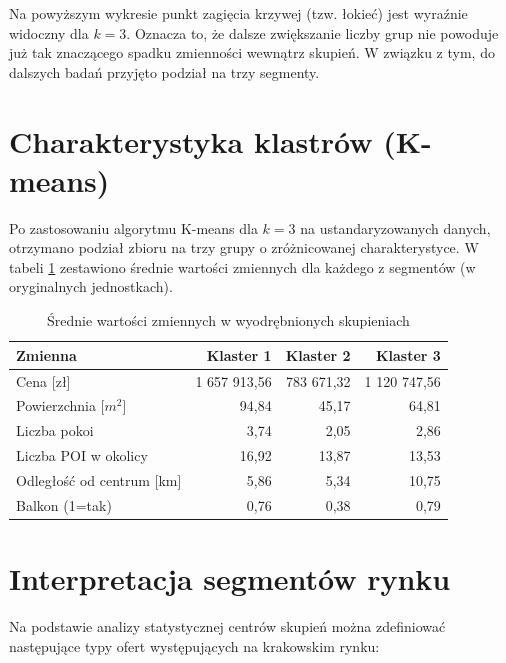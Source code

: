 \documentclass{report}
\begin{document}
Na powyższym wykresie punkt zagięcia krzywej (tzw. łokieć) jest wyraźnie widoczny dla $k=3$. Oznacza to, że dalsze zwiększanie liczby grup nie powoduje już tak znaczącego spadku zmienności wewnątrz skupień. W związku z tym, do dalszych badań przyjęto podział na trzy segmenty.

\section{Charakterystyka klastrów (K-means)}

Po zastosowaniu algorytmu K-means dla $k=3$ na ustandaryzowanych danych, otrzymano podział zbioru na trzy grupy o zróżnicowanej charakterystyce. W tabeli \ref{tab:klastry} zestawiono średnie wartości zmiennych dla każdego z segmentów (w oryginalnych jednostkach).

\begin{table}[H]
\caption{Średnie wartości zmiennych w wyodrębnionych skupieniach}
\label{tab:klastry}
\centering
\begin{tabular}{lrrr}
\toprule
Zmienna & Klaster 1 & Klaster 2 & Klaster 3 \\
\midrule
Cena [zł] & 1 657 913,56 & 783 671,32 & 1 120 747,56 \\
Powierzchnia [$m^2$] & 94,84 & 45,17 & 64,81 \\
Liczba pokoi & 3,74 & 2,05 & 2,86 \\
Liczba POI w okolicy & 16,92 & 13,87 & 13,53 \\
Odległość od centrum [km] & 5,86 & 5,34 & 10,75 \\
Balkon (1=tak) & 0,76 & 0,38 & 0,79 \\
\bottomrule
\end{tabular}
\end{table}

\section{Interpretacja segmentów rynku}

Na podstawie analizy statystycznej centrów skupień można zdefiniować następujące typy ofert występujących na krakowskim rynku:
\end{document}
